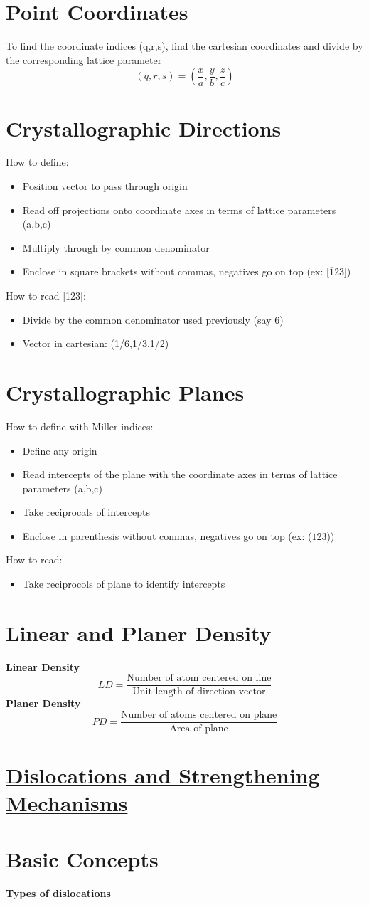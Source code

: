 \documentclass[12pt]{article}
\begin{document}
\section*{Point Coordinates}
To find the coordinate indices (q,r,s), find the cartesian coordinates and divide by the corresponding lattice parameter
\[(q,r,s) = \left( \frac{x}{a}, \frac{y}{b}, \frac{z}{c} \right)\]
\section*{Crystallographic Directions}
How to define:
\begin{itemize}
    \item Position vector to pass through origin
    \item Read off projections onto coordinate axes in terms of lattice parameters (a,b,c)
    \item Multiply through by common denominator
    \item Enclose in square brackets without commas, negatives go on top (ex: [$\overline{1} 2 3$])
\end{itemize}
How to read [123]:
\begin{itemize}
    \item Divide by the common denominator used previously (say 6)
    \item Vector in cartesian: (1/6,1/3,1/2)
\end{itemize}
\section*{Crystallographic Planes}
How to define with Miller indices:
\begin{itemize}
    \item Define any origin
    \item Read intercepts of the plane with the coordinate axes in terms of lattice parameters (a,b,c)
    \item Take reciprocals of intercepts
    \item Enclose in parenthesis without commas, negatives go on top (ex: ($\overline{1} 2 3$))
\end{itemize}
How to read:
\begin{itemize}
    \item Take reciprocols of plane to identify intercepts
\end{itemize}
\section*{Linear and Planer Density}
\textbf{Linear Density}
\[LD = \frac{\text{Number of atom centered on line}}{\text{Unit length of direction vector}}\]
\textbf{Planer Density}
\[PD=\frac{\text{Number of atoms centered on plane}}{\text{Area of plane}}\]
\newpage
\section*{\LARGE\underline{Dislocations and Strengthening Mechanisms}}
\section*{Basic Concepts}
\textbf{Types of dislocations}
\end{document}
